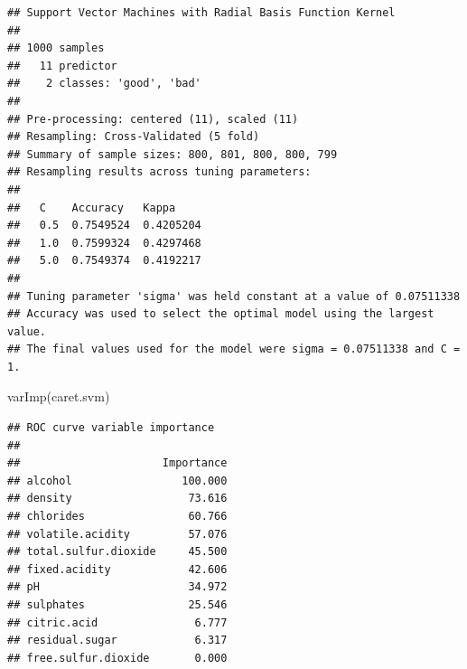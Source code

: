 \documentclass[
]{book}
\newenvironment{Shaded}{\begin{snugshade}}{\end{snugshade}}
\newcommand{\AttributeTok}[1]{\textcolor[rgb]{0.77,0.63,0.00}{#1}}
\newcommand{\FunctionTok}[1]{\textcolor[rgb]{0.00,0.00,0.00}{#1}}
\newcommand{\NormalTok}[1]{#1}
\newcommand{\SpecialCharTok}[1]{\textcolor[rgb]{0.00,0.00,0.00}{#1}}
\theoremstyle{break}
\theoremstyle{definition}
\theoremstyle{definition}
\theoremstyle{definition}
\theoremstyle{definition}
\theoremstyle{remark}
\begin{document}
\begin{verbatim}
## Support Vector Machines with Radial Basis Function Kernel 
## 
## 1000 samples
##   11 predictor
##    2 classes: 'good', 'bad' 
## 
## Pre-processing: centered (11), scaled (11) 
## Resampling: Cross-Validated (5 fold) 
## Summary of sample sizes: 800, 801, 800, 800, 799 
## Resampling results across tuning parameters:
## 
##   C    Accuracy   Kappa    
##   0.5  0.7549524  0.4205204
##   1.0  0.7599324  0.4297468
##   5.0  0.7549374  0.4192217
## 
## Tuning parameter 'sigma' was held constant at a value of 0.07511338
## Accuracy was used to select the optimal model using the largest value.
## The final values used for the model were sigma = 0.07511338 and C = 1.
\end{verbatim}

\begin{Shaded}
\begin{Highlighting}[]
\FunctionTok{varImp}\NormalTok{(caret.svm)}
\end{Highlighting}
\end{Shaded}

\begin{verbatim}
## ROC curve variable importance
## 
##                      Importance
## alcohol                 100.000
## density                  73.616
## chlorides                60.766
## volatile.acidity         57.076
## total.sulfur.dioxide     45.500
## fixed.acidity            42.606
## pH                       34.972
## sulphates                25.546
## citric.acid               6.777
## residual.sugar            6.317
## free.sulfur.dioxide       0.000
\end{verbatim}

\begin{Shaded}
\end{Shaded}
\end{document}
